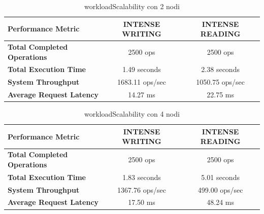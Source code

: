 \documentclass[12pt]{article}
\begin{document}
\begin{table}[H]
\centering
\begin{tabular}{|l|c|c|}
\hline
\textbf{Performance Metric} & \textbf{INTENSE WRITING} & \textbf{INTENSE READING} \\
\hline
\textbf{Total Completed Operations} & 2500 ops & 2500 ops \\
\hline
\textbf{Total Execution Time} & 1.49 seconds & 2.38 seconds \\
\hline
\textbf{System Throughput} & 1683.11 ops/sec & 1050.75 ops/sec \\
\hline
\textbf{Average Request Latency} & 14.27 ms & 22.75 ms \\
\hline
\end{tabular}
\caption{workloadScalability con 2 nodi}
\label{t_2nodes}
\end{table}

\begin{table}[H]
\centering
\begin{tabular}{|l|c|c|}
\hline
\textbf{Performance Metric} & \textbf{INTENSE WRITING} & \textbf{INTENSE READING} \\
\hline
\textbf{Total Completed Operations} & 2500 ops & 2500 ops \\
\hline
\textbf{Total Execution Time} & 1.83 seconds & 5.01 seconds \\
\hline
\textbf{System Throughput} & 1367.76 ops/sec & 499.00 ops/sec \\
\hline
\textbf{Average Request Latency} & 17.50 ms & 48.24 ms \\
\hline
\end{tabular}
\caption{workloadScalability con 4 nodi}
\label{t_4nodes}
\end{table}
\end{document}

